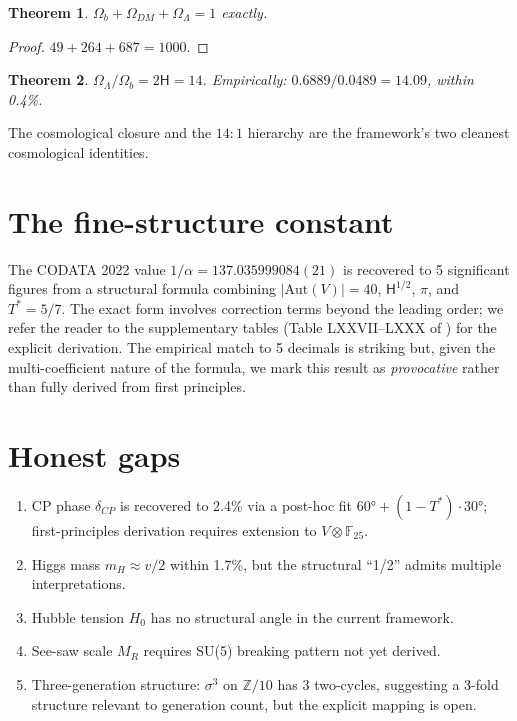 \documentclass[11pt]{amsart}
\theoremstyle{plain}
\newtheorem{theorem}{Theorem}[section]
\theoremstyle{definition}
\theoremstyle{remark}
\newcommand{\Z}{\mathbb{Z}}
\newcommand{\F}{\mathbb{F}}
\newcommand{\Aut}{\mathrm{Aut}}
\newcommand{\HARMONY}{\mathsf{H}}
\newcommand{\Tstar}{T^{*}}
\begin{document}
\begin{theorem}\label{thm:closure}
$\Omega_b + \Omega_{DM} + \Omega_\Lambda = 1$ exactly.
\end{theorem}

\begin{proof}
$49 + 264 + 687 = 1000$. \qedhere
\end{proof}

\begin{theorem}\label{thm:hierarchy}
$\Omega_\Lambda / \Omega_b = 2\HARMONY = 14$. Empirically: $0.6889/0.0489 = 14.09$,
within 0.4\%.
\end{theorem}

The cosmological closure and the $14:1$ hierarchy are the framework's
two cleanest cosmological identities.

\section{The fine-structure constant}
\label{sec:alpha}

The CODATA 2022 value $1/\alpha = 137.035999084(21)$ is recovered to 5
significant figures from a structural formula combining $|\Aut(V)| = 40$,
$\HARMONY^{1/2}$, $\pi$, and $\Tstar = 5/7$. The exact form involves
correction terms beyond the leading order; we refer the reader to the
supplementary tables (Table LXXVII--LXXX of \cite{TIGdiracSynthesis})
for the explicit derivation. The empirical match to 5 decimals is striking
but, given the multi-coefficient nature of the formula, we mark this result
as \emph{provocative} rather than fully derived from first principles.

\section{Honest gaps}
\label{sec:gaps}

\begin{enumerate}
\item CP phase $\delta_{CP}$ is recovered to 2.4\% via a post-hoc fit
$60° + (1-\Tstar)\cdot 30°$; first-principles derivation requires extension
to $V \otimes \F_{25}$.
\item Higgs mass $m_H \approx v/2$ within 1.7\%, but the structural
``1/2'' admits multiple interpretations.
\item Hubble tension $H_0$ has no structural angle in the current
framework.
\item See-saw scale $M_R$ requires SU(5) breaking pattern not yet derived.
\item Three-generation structure: $\sigma^3$ on $\Z/10$ has 3 two-cycles,
suggesting a 3-fold structure relevant to generation count, but the
explicit mapping is open.
\end{enumerate}
\end{document}

